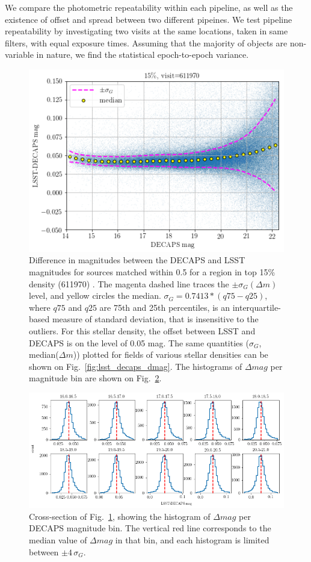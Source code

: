 \documentclass[DM,lsstdraft,toc,usenatbib]{lsstdoc}
\begin{document}
We compare the photometric repeatability within each pipeline, as well as the existence of offset and spread between two different pipeines. We test pipeline repeatability by investigating two visits at the same locations,  taken in same filters, with equal exposure times.  Assuming that the majority of objects are non-variable in nature, we find the statistical epoch-to-epoch variance. 

\begin{figure}
\begin{centering}
\includegraphics[width=0.6\columnwidth]{figs/15_decaps_lsst_dmag_density_15.png}
\caption{Difference in magnitudes between the DECAPS and LSST magnitudes for sources matched within 0.5 \arcsec for a region in top 15\% density (611970) . The magenta dashed line traces the $\pm \sigma_{G}(\Delta m)$ level, and yellow circles the median.  $\sigma_{G} = 0.7413 * (q75 - q25)$, where $q75$ and $q25$ are 75th and 25th percentiles, is an interquartile-based measure of standard deviation, that is insensitive to the outliers. For this stellar density, the offset between LSST and DECAPS is on the level of 0.05 mag. The same quantities ($\sigma_{G}$, median($\Delta m$)) plotted for fields of various stellar densities can be shown on Fig.~\ref{fig:lsst_decaps_dmag}. The histograms of $\Delta mag$ per magnitude bin are shown on Fig.~\ref{fig:dmag_hist}.}
\label{fig:dmag_scatter}
\end{centering}
\end{figure} 


\begin{figure}
\includegraphics[width=1.0\columnwidth]{figs/16_rms_decaps_lsst_611970hist_panel.png}
\caption{Cross-section of Fig.~\ref{fig:dmag_scatter}, showing the histogram of $\Delta mag$ per DECAPS magnitude bin. The vertical red line corresponds to the median value of $\Delta mag$ in that bin, and each histogram is limited between $\pm 4 \, \sigma_{G}$. }
\label{fig:dmag_hist}
\end{figure} 
\end{document}
